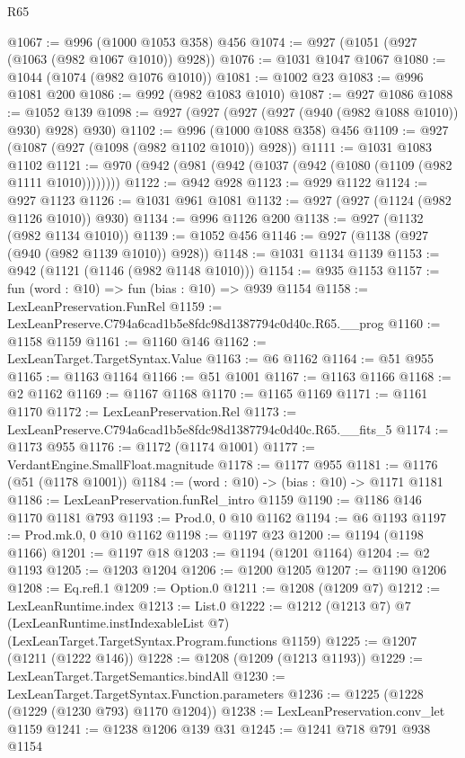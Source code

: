 \begin{lexlean}{R65}
\begin{coremodule}
@1067 := @996 (@1000 @1053 @358) @456
@1074 := @927 (@1051 (@927 (@1063 (@982 @1067 @1010)) @928))
@1076 := @1031 @1047 @1067
@1080 := @1044 (@1074 (@982 @1076 @1010))
@1081 := @1002 @23
@1083 := @996 @1081 @200
@1086 := @992 (@982 @1083 @1010)
@1087 := @927 @1086
@1088 := @1052 @139
@1098 := @927 (@927 (@927 (@927 (@940 (@982 @1088 @1010)) @930) @928) @930)
@1102 := @996 (@1000 @1088 @358) @456
@1109 := @927 (@1087 (@927 (@1098 (@982 @1102 @1010)) @928))
@1111 := @1031 @1083 @1102
@1121 := @970 (@942 (@981 (@942 (@1037 (@942 (@1080 (@1109 (@982 @1111 @1010))))))))
@1122 := @942 @928
@1123 := @929 @1122
@1124 := @927 @1123
@1126 := @1031 @961 @1081
@1132 := @927 (@927 (@1124 (@982 @1126 @1010)) @930)
@1134 := @996 @1126 @200
@1138 := @927 (@1132 (@982 @1134 @1010))
@1139 := @1052 @456
@1146 := @927 (@1138 (@927 (@940 (@982 @1139 @1010)) @928))
@1148 := @1031 @1134 @1139
@1153 := @942 (@1121 (@1146 (@982 @1148 @1010)))
@1154 := @935 @1153
@1157 := fun (word : @10) => fun (bias : @10) => @939 @1154
@1158 := LexLeanPreservation.FunRel
@1159 := LexLeanPreserve.C794a6cad1b5e8fdc98d1387794c0d40c.R65.__prog
@1160 := @1158 @1159
@1161 := @1160 @146
@1162 := LexLeanTarget.TargetSyntax.Value
@1163 := @6 @1162
@1164 := @51 @955
@1165 := @1163 @1164
@1166 := @51 @1001
@1167 := @1163 @1166
@1168 := @2 @1162
@1169 := @1167 @1168
@1170 := @1165 @1169
@1171 := @1161 @1170
@1172 := LexLeanPreservation.Rel
@1173 := LexLeanPreserve.C794a6cad1b5e8fdc98d1387794c0d40c.R65.__fits_5
@1174 := @1173 @955
@1176 := @1172 (@1174 @1001)
@1177 := VerdantEngine.SmallFloat.magnitude
@1178 := @1177 @955
@1181 := @1176 (@51 (@1178 @1001))
@1184 := (word : @10) -> (bias : @10) -> @1171 @1181
@1186 := LexLeanPreservation.funRel_intro @1159
@1190 := @1186 @146 @1170 @1181 @793
@1193 := Prod.{0, 0} @10 @1162
@1194 := @6 @1193
@1197 := Prod.mk.{0, 0} @10 @1162
@1198 := @1197 @23
@1200 := @1194 (@1198 @1166)
@1201 := @1197 @18
@1203 := @1194 (@1201 @1164)
@1204 := @2 @1193
@1205 := @1203 @1204
@1206 := @1200 @1205
@1207 := @1190 @1206
@1208 := Eq.refl.{1}
@1209 := Option.{0}
@1211 := @1208 (@1209 @7)
@1212 := LexLeanRuntime.index
@1213 := List.{0}
@1222 := @1212
    (@1213 @7)
    @7
    (LexLeanRuntime.instIndexableList @7)
    (LexLeanTarget.TargetSyntax.Program.functions @1159)
@1225 := @1207 (@1211 (@1222 @146))
@1228 := @1208 (@1209 (@1213 @1193))
@1229 := LexLeanTarget.TargetSemantics.bindAll
@1230 := LexLeanTarget.TargetSyntax.Function.parameters
@1236 := @1225 (@1228 (@1229 (@1230 @793) @1170 @1204))
@1238 := LexLeanPreservation.conv_let @1159
@1241 := @1238 @1206 @139 @31
@1245 := @1241 @718 @791 @938 @1154

\end{coremodule}
\end{lexlean}
